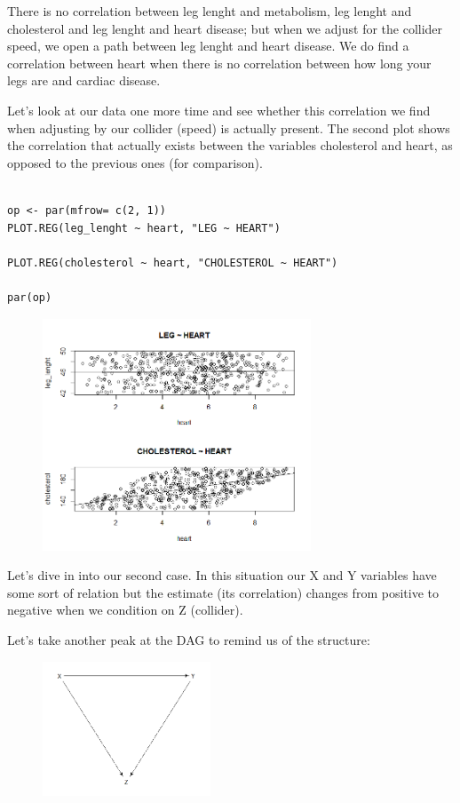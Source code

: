 \documentclass{article}
\begin{document}
There is no correlation between leg lenght and metabolism, leg lenght and  cholesterol and leg lenght and heart disease; but when we adjust for the  collider speed, we open a path between leg lenght and heart disease. We  do find  a correlation between heart when there is no correlation between  how long your legs are and cardiac disease.

Let's look at our data one more time and see whether this correlation we find when adjusting by our collider (speed) is actually present. The second plot shows the correlation that actually exists between the variables cholesterol and heart, as opposed to the previous ones (for comparison).


\begin{lstlisting}

op <- par(mfrow= c(2, 1))
PLOT.REG(leg_lenght ~ heart, "LEG ~ HEART")

PLOT.REG(cholesterol ~ heart, "CHOLESTEROL ~ HEART")

par(op)
\end{lstlisting}

\begin{figure}[h]
\includegraphics[width=8cm]{COMP_LEG_CHOL_HEART.png}
\centering
\end{figure}



Let's dive in into our second case. In this situation our X and Y variables have some sort of relation but the estimate (its correlation) changes from positive to negative when we condition on Z (collider).

Let's take another peak at the DAG to remind us of the structure:

\begin{figure}[h]
\includegraphics[width=5cm]{DAG_Situation2.png}
\centering
\end{figure}
\end{document}
